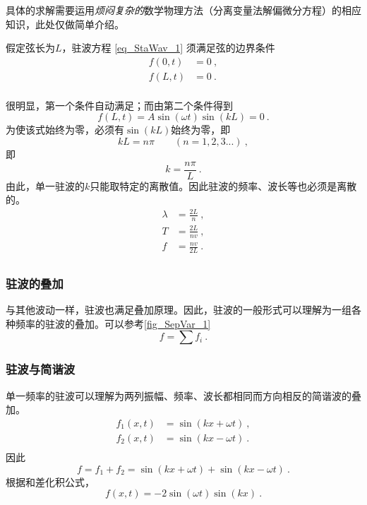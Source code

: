 具体的求解需要运用\textsl{烦闷复杂的}数学物理方法（分离变量法解偏微分方程）的相应知识，此处仅做简单介绍。

假定弦长为$L$，驻波方程 \autoref{eq_StaWav_1} 须满足弦的边界条件 
$$
\begin{aligned}
f(0,t)&=0~,\\
f(L,t)&=0~.\\
\end{aligned}
$$

很明显，第一个条件自动满足；而由第二个条件得到
$$
f(L,t)=A\sin(\omega t)\sin(kL)=0~.
$$
为使该式始终为零，必须有$\sin(kL)$始终为零，即
$$kL = n\pi \qquad (n=1,2,3...)~,$$
即
\begin{equation}
k=\frac{n\pi}{L}~.
\end{equation}
由此，单一驻波的$k$只能取特定的离散值。因此驻波的频率、波长等也必须是离散的。
\begin{equation}
\begin{aligned}
\lambda &=\frac{2L}{n}~,\\
T &=\frac{2L}{nv}~,\\
f &=\frac{nv}{2L}~.\\
\end{aligned}
\end{equation}
\subsubsection{驻波的叠加}
与其他波动一样，驻波也满足叠加原理。因此，驻波的一般形式可以理解为一组各种频率的驻波的叠加。可以参考\autoref{fig_SepVar_1}~
$$f=\sum f_i~.$$

\subsubsection{驻波与简谐波}
单一频率的驻波可以理解为两列振幅、频率、波长都相同而方向相反的简谐波的叠加。
$$
\begin{aligned}
f_1(x,t)&=\sin(kx+\omega t)~,\\
f_2(x,t)&=\sin(kx-\omega t)~.\\
\end{aligned}
$$
因此
$$f=f_1+f_2=\sin(kx+\omega t)+\sin(kx-\omega t)~.$$
根据和差化积公式，
\begin{equation}
f(x,t)=-2\sin(\omega t)\sin(kx)~.
\end{equation}

